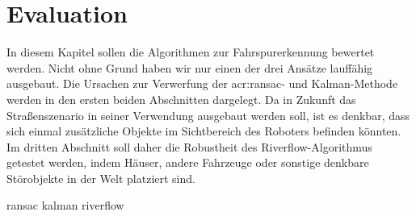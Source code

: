 \chapter{Evaluation \dcfirstauthorshort}
\label{cha:evaluation}

In diesem Kapitel sollen die Algorithmen zur Fahrspurerkennung bewertet werden. Nicht ohne Grund haben wir nur einen der drei Ansätze lauffähig ausgebaut. Die Ursachen zur Verwerfung der \gls{acr:ransac}- und Kalman-Methode werden in den ersten beiden Abschnitten dargelegt. 
Da in Zukunft das Straßenszenario in seiner Verwendung ausgebaut werden soll, ist es denkbar, dass sich einmal zusätzliche Objekte im Sichtbereich des Roboters befinden könnten. Im dritten Abschnitt soll daher die Robustheit des Riverflow-Algorithmus getestet werden, indem Häuser, andere Fahrzeuge oder sonstige denkbare Störobjekte in der Welt platziert sind.

{ransac}
{kalman}
{riverflow}
